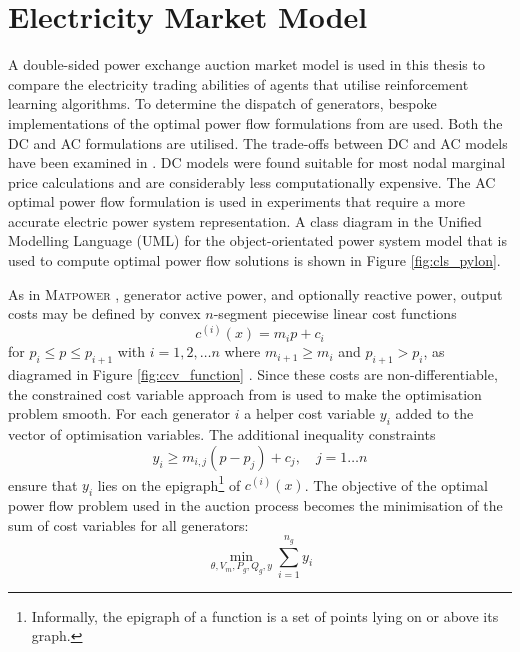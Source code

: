 \section{Electricity Market Model}
A double-sided power exchange auction market model is used in this
thesis to compare the electricity trading abilities of agents that utilise
reinforcement learning algorithms. To determine the dispatch of generators,
bespoke implementations of the optimal power flow formulations from \matpower \cite[\S5]{pserc:mp_manual} are used.  Both the DC
and AC formulations are utilised. The trade-offs between DC and AC models have
been examined in . DC models were found suitable for most
nodal marginal price calculations and are considerably less computationally
expensive. The AC optimal power flow formulation is used in experiments that
require a more accurate electric power system representation. A class diagram
in the Unified Modelling Language (UML) for the object-orientated power system
model that is used to compute optimal power flow solutions is shown in Figure
\ref{fig:cls_pylon}.


As in \textsc{Matpower} \cite[p.26]{pserc:mp_manual}, generator active
power, and optionally reactive power, output costs may be defined by convex
$n$-segment piecewise linear cost functions
\begin{equation}
c^{(i)}(x) = m_ip + c_i
\end{equation}
for $p_i \leq p \leq p_{i+1}$ with $i = 1,2,\dotsc n$ where $m_{i+1} \geq m_i$
and $p_{i+1} > p_i$, as diagramed in Figure \ref{fig:ccv_function}
\cite[Figure5-3]{pserc:mp_manual}. Since these costs are non-differentiable,
the constrained cost variable approach from \cite{zimmerman:ccv} is used to
make the optimisation problem smooth.  For each generator $i$ a helper cost
variable $y_i$ added to the vector of optimisation variables.  The additional
inequality constraints
\begin{equation}
y_i \geq m_{i,j}(p-p_j) + c_j, \quad j = 1\dotsc n
\end{equation}
ensure that $y_i$ lies on the epigraph\footnote{Informally, the epigraph of a
function is a set of points lying on or above its graph.} of $c^{(i)}(x)$. The
objective of the optimal power flow problem used in the auction process
becomes the minimisation of the sum of cost variables for all generators:
\begin{equation}
\min_{\theta, V_m, P_g, Q_g, y} \sum_{i=1}^{n_g}y_i
\end{equation}

